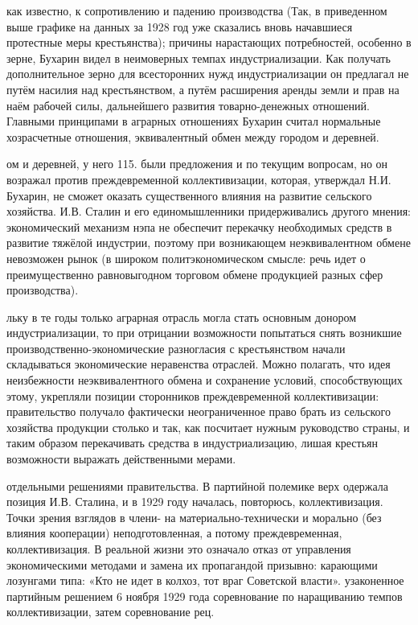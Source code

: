 как известно, к сопротивлению и падению производства (Так, в приведенном выше графике на данных за 1928 год уже сказались вновь начавшиеся протестные меры крестьянства); причины нарастающих потребностей, особенно в зерне, Бухарин видел в неимоверных темпах индустриализации. Как получать дополнительное зерно для всесторонних нужд индустриализации он предлагал не путём насилия над крестьянством, а путём расширения аренды земли и прав на наём рабочей силы, дальнейшего развития товарно-денежных отношений. Главными принципами в аграрных отношениях Бухарин считал нормальные хозрасчетные отношения, эквивалентный обмен между городом и деревней.

ом и деревней, у него 115. были предложения и по текущим вопросам, но он возражал против преждевременной коллективизации, которая, утверждал Н.И. Бухарин, не сможет оказать существенного влияния на развитие сельского хозяйства. И.В. Сталин и его единомышленники придерживались другого мнения: экономический механизм нэпа не обеспечит перекачку необходимых средств в развитие тяжёлой индустрии, поэтому при возникающем неэквивалентном обмене невозможен рынок (в широком политэкономическом смысле: речь идет о преимущественно равновыгодном торговом обмене продукцией разных сфер производства).

льку в те годы только аграрная отрасль могла стать основным донором индустриализации, то при отрицании возможности попытаться снять возникшие производственно-экономические разногласия с крестьянством начали складываться экономические неравенства отраслей. Можно полагать, что идея неизбежности неэквивалентного обмена и сохранение условий, способствующих этому, укрепляли позиции сторонников преждевременной коллективизации: правительство получало фактически неограниченное право брать из сельского хозяйства продукции столько и так, как посчитает нужным руководство страны, и таким образом перекачивать средства в индустриализацию, лишая крестьян возможности выражать действенными мерами.

отдельными решениями правительства. В партийной полемике верх одержала позиция И.В. Сталина, и в 1929 году началась, повторюсь, коллективизация. Точки зрения взглядов в члени- на материально-технически и морально (без влияния кооперации) неподготовленная, а потому преждевременная, коллективизация. В реальной жизни это означало отказ от управления экономическими методами и замена их пропагандой призывно: карающими лозунгами типа: «Кто не идет в колхоз, тот враг Советской власти». узаконенное партийным решением 6 ноября 1929 года соревнование по наращиванию темпов коллективизации, затем соревнование рец.

